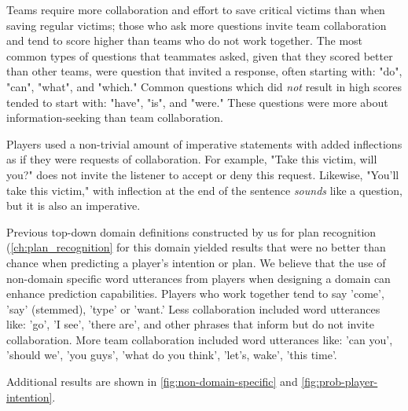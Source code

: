 Teams require more collaboration and effort to save critical victims than when
saving regular victims; those who ask more questions invite team collaboration
and tend to score higher than teams who do not work together. The most common
types of questions that teammates asked, given that they scored better than
other teams, were question that invited a response, often starting with: "do",
"can", "what", and "which." Common questions which did \textit{not} result in
high scores tended to start with: "have", "is", and "were." These questions
were more about information-seeking than team collaboration.

Players used a non-trivial amount of imperative statements with added
inflections as if they were requests of collaboration. For example, "Take this
victim, will you?" does not invite the listener to accept or deny this request.
Likewise, "You'll take this victim," with inflection at the end of the sentence
\textit{sounds} like a question, but it is also an imperative.

Previous top-down domain definitions constructed by us for plan recognition
(\autoref{ch:plan_recognition} for this domain yielded results
that were no better than chance when predicting a player's intention or plan.
We believe that the use of non-domain specific word utterances from players
when designing a domain can enhance prediction capabilities. Players who work
together tend to say 'come', 'say' (stemmed), 'type' or 'want.' Less
collaboration included word utterances like: 'go', 'I see', 'there are', and
other phrases that inform but do not invite collaboration. More team
collaboration included word utterances like: 'can you', 'should we', 'you
guys', 'what do you think', 'let's, wake', 'this time'.

Additional results are shown in \autoref{fig:non-domain-specific}
and \autoref{fig:prob-player-intention}.


